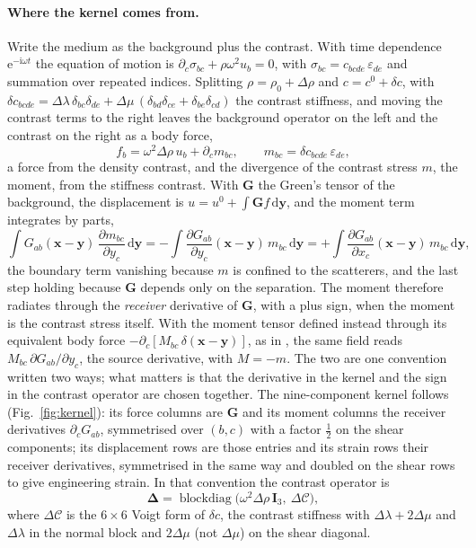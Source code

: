 \documentclass[11pt,a4paper]{article}
\newcommand{\bD}{\boldsymbol{\Delta}}
\newcommand{\bI}{\mathbf{I}}
\newcommand{\bG}{\mathbf{G}}
\newcommand{\dd}{\mathrm{d}}
\begin{document}
\paragraph{Where the kernel comes from.} Write the medium as the background plus the contrast. With
time dependence $\mathrm{e}^{-\mathrm{i}\omega t}$ the equation of motion is
$\partial_c\sigma_{bc}+\rho\omega^2u_b=0$, with $\sigma_{bc}=c_{bcde}\,\varepsilon_{de}$ and
summation over repeated indices. Splitting $\rho=\rho_0+\Delta\rho$ and $c=c^0+\delta c$, with
$\delta c_{bcde}=\Delta\lambda\,\delta_{bc}\delta_{de}+\Delta\mu\,(\delta_{bd}\delta_{ce}+\delta_{be}\delta_{cd})$
the contrast stiffness, and moving the contrast terms to the right leaves the background operator on
the left and the contrast on the right as a body force,
\begin{equation}\label{eq:bodyforce}
  f_b=\omega^2\Delta\rho\,u_b+\partial_c m_{bc},\qquad m_{bc}=\delta c_{bcde}\,\varepsilon_{de},
\end{equation}
a force from the density contrast, and the divergence of the contrast stress $m$, the moment, from
the stiffness contrast. With $\bG$ the Green's tensor of the background, the displacement is
$u=u^0+\int\bG f\,\dd\mathbf y$, and the moment term integrates by parts,
\begin{equation}\label{eq:byparts}
  \int G_{ab}(\mathbf x-\mathbf y)\,\frac{\partial m_{bc}}{\partial y_c}\,\dd\mathbf y
  =-\int\frac{\partial G_{ab}}{\partial y_c}(\mathbf x-\mathbf y)\,m_{bc}\,\dd\mathbf y
  =+\int\frac{\partial G_{ab}}{\partial x_c}(\mathbf x-\mathbf y)\,m_{bc}\,\dd\mathbf y ,
\end{equation}
the boundary term vanishing because $m$ is confined to the scatterers, and the last step holding
because $\bG$ depends only on the separation. The moment therefore radiates through the
\emph{receiver} derivative of $\bG$, with a plus sign, when the moment is the contrast stress
itself. With the moment tensor defined instead through its equivalent body force
$-\partial_c[M_{bc}\,\delta(\mathbf x-\mathbf y)]$, as in \citet{Aki2002}, the same field reads
$M_{bc}\,\partial G_{ab}/\partial y_c$, the source derivative, with $M=-m$. The two are one
convention written two ways; what matters is that the derivative in the kernel and the sign in the
contrast operator are chosen together. The nine-component kernel follows (Fig.~\ref{fig:kernel}): its force columns are
$\bG$ and its moment columns the receiver derivatives $\partial_cG_{ab}$, symmetrised over $(b,c)$
with a factor $\tfrac12$ on the shear components; its displacement rows are those entries and its
strain rows their receiver derivatives, symmetrised in the same way and doubled on the shear rows to
give engineering strain. In that convention the contrast operator is
\begin{equation}\label{eq:delta}
  \bD=\operatorname{blockdiag}\!\bigl(\omega^2\Delta\rho\,\bI_3,\ \Delta\mathcal{C}\bigr),
\end{equation}
where $\Delta\mathcal{C}$ is the $6\times6$ Voigt form of $\delta c$, the contrast stiffness with $\Delta\lambda+2\Delta\mu$ and
$\Delta\lambda$ in the normal block and $2\Delta\mu$ (not $\Delta\mu$) on the shear diagonal.
\end{document}
